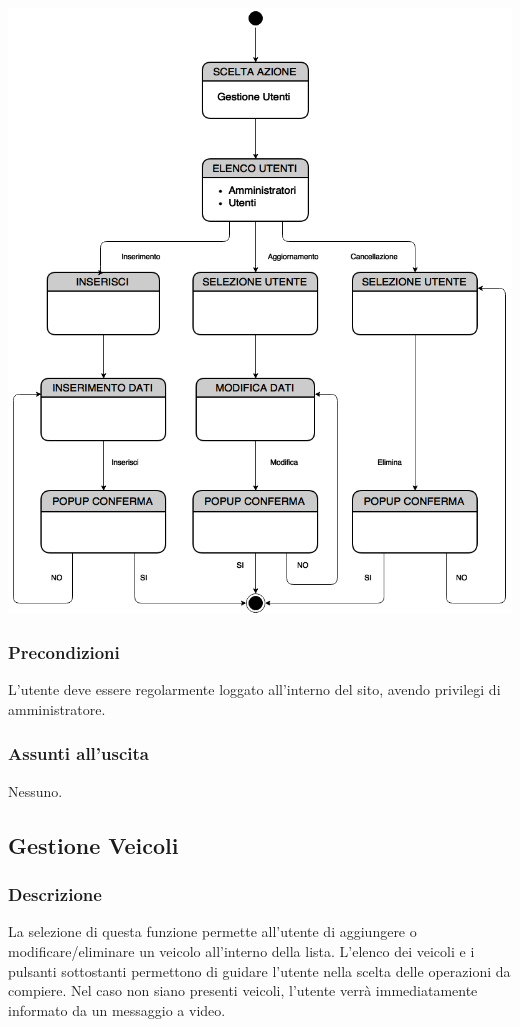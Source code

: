 \documentclass[a4paper,12pt]{article}
\begin{document}
\begin{center}
\includegraphics[scale=0.45]{Utenti.png}
\end{center}
\subsubsection{Precondizioni}
L'utente deve essere regolarmente loggato all'interno del sito, avendo privilegi di amministratore.
\subsubsection{Assunti all'uscita}
Nessuno.


\subsection{Gestione Veicoli}
\subsubsection{Descrizione}
La selezione di questa funzione permette all'utente di aggiungere o modificare/eliminare un veicolo all'interno della lista. L'elenco dei veicoli e i pulsanti sottostanti permettono di guidare l'utente nella scelta delle operazioni da compiere. Nel caso non siano presenti veicoli, l'utente verrà immediatamente informato da un messaggio a video.
\end{document}
